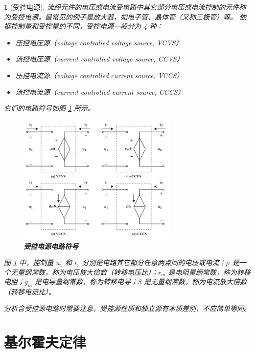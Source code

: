 \documentclass[UTF8]{report}
\theoremstyle{MyLineTheoremStyle} %
\theoremstyle{MyBlockTheoremStyle} %
\theoremstyle{MySubsubsectionStyle} %
\newtheorem{definition}{}
\begin{document}
\begin{definition}[受控电源]

流经元件的电压或电流受电路中其它部分电压或电流控制的元件称为受控电源。最常见的例子是放大器，如电子管、晶体管（又称三极管）等。
依据控制量和受控量的不同，受控电源一般分为 4 种：
\begin{itemize}
    \item 压控电压源（voltage controlled voltage source, VCVS）
    \item 流控电压源（current controlled voltage source, CCVS）
    \item 压控电流源（voltage controlled current source, VCCS）
    \item 流控电流源（current controlled current source, CCCS）
\end{itemize}
它们的电路符号如图 \ref{受控电源电路符号} 所示。 

\begin{figure}[H]\centering
\includegraphics[width=0.7\textwidth]{assets/1,2/受控电源电路符号.drawio.pdf}
\caption{\textbf{受控电源电路符号}}\label{受控电源电路符号}
\end{figure}

图 \ref{受控电源电路符号} 中，控制量 $u_1$ 和 $i_1$ 分别是电路其它部分任意两点间的电压或电流；$\mu$ 是一个无量纲常数，称为电压放大倍数（转移电压比）；$r_m$ 是电阻量纲常数，称为转移电阻；$g_m$ 是电导量纲常数，称为转移电导；$\beta$ 是无量纲常数，称为电流放大倍数（转移电流比）。

分析含受控源电路时需要注意，受控源性质和独立源有本质差别，不应简单等同。
\end{definition}



\section{基尔霍夫定律}
\end{document}
